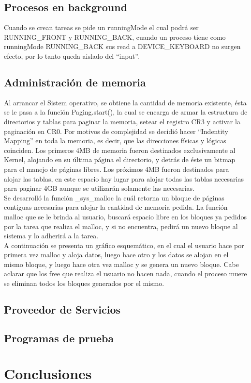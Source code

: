 \documentclass[a4paper,10pt]{article}
\begin{document}
\subsection{Procesos en background}
Cuando se crean tareas se pide un runningMode el cual podrá ser RUNNING\_FRONT y RUNNING\_BACK, cuando un proceso tiene como runningMode 
RUNNING\_BACK sus read a DEVICE\_KEYBOARD no surgen efecto, por lo tanto queda aislado del ``input''.


\subsection{Administración de memoria}
Al arrancar el Sistem operativo, se obtiene la cantidad de memoria existente, ésta se le pasa a la función Paging.start(), la cual se encarga de
armar la estructura de directorios y tablas para paginar la memoria, setear el registro CR3 y activar la paginación en CR0. Por motivos
de complejidad se decidió hacer ``Indentity Mapping'' en toda la memoria, es decir, que las direcciones físicas y lógicas coinciden.
Los primeros 4MB de memoria fueron destinados exclusivamente al Kernel, alojando en su última página el directorio, y detrás de éste un bitmap para
el manejo de páginas libres. Los próximos 4MB fueron destinados para alojar las tablas, en este espacio hay lugar para alojar todas las tablas necesarias
para paginar 4GB aunque se utilizarán solamente las necesarias.\\
Se desarrolló la función \_sys\_malloc la cuál retorna un bloque de páginas contiguas necesarias para alojar la cantidad de memoria pedida. La función malloc
que se le brinda al usuario, buscará espacio libre en los bloques ya pedidos por la tarea que realiza el malloc, y si no encuentra, pedirá un nuevo bloque
al sistema y lo adherirá a la tarea.\\
\noindent A continuación se presenta un gráfico esquemático, en el cual el usuario hace por primera vez malloc y aloja datos, luego hace otro y los datos se
alojan en el mismo bloque, y luego hace otra vez malloc y se genera un nuevo bloque. Cabe aclarar que los free que realiza el usuario no hacen nada, cuando
el proceso muere se eliminan todos los bloques generados por el mismo.

\begin{center}
\end{center}

\subsection{Proveedor de Servicios}

\subsection{Programas de prueba}


\newpage
\section{Conclusiones}

\bigskip
\end{document}
